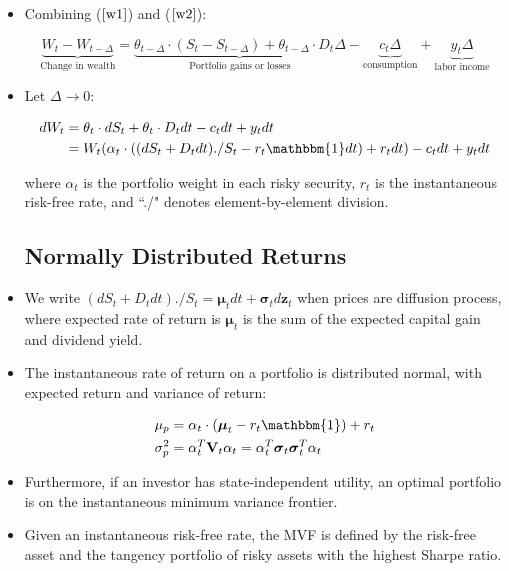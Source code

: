 \documentclass{article}
\newcommand{\Vbf}{\mathbf{V}}
\newcommand{\zbf}{\mathbf{z}}
\newcommand{\mubf}{\boldsymbol{\mu}}
\newcommand{\sigmabf}{\boldsymbol{\sigma}}
\newcommand{\onebf}{\mathbbm{1}}
\begin{document}
\begin{itemize}
\item Combining ($\ref{w1}$) and ($\ref{w2}$):

$$
\underbrace{W_t - W_{t-\Delta}}_{\text{Change in wealth}} = \underbrace{\theta_{t-\Delta} \cdot (S_t - S_{t-\Delta}) + \theta_{t-\Delta} \cdot D_t \Delta}_{\text{Portfolio gains or losses}} - \underbrace{c_t \Delta}_{\text{consumption}} + \underbrace{y_t \Delta}_{\text{labor income}}
$$

\item Let $\Delta \to 0$:

\begin{align*}
dW_t 
&= \theta_t \cdot dS_t + \theta_t \cdot D_t dt - c_t dt + y_t dt\\
&= W_t(\alpha_t \cdot ((dS_t + D_t dt)./S_t - r_t \onebf dt) + r_t dt) - c_t dt + y_t dt\\
\end{align*}

where $\alpha_t$ is the portfolio weight in each risky security, $r_t$ is the instantaneous risk-free rate, and ``./" denotes element-by-element division.

\subsection*{Normally Distributed Returns}

\item We write $(dS_t + D_t dt)./S_t = \mubf_t dt + \sigmabf_t d\zbf_t$ when prices are diffusion process, where expected rate of return is $\mubf_t$ is the sum of the expected capital gain and dividend yield.  

\item The instantaneous rate of return on a portfolio is distributed normal, with expected return and variance of return:

\begin{align*}
\mu_p &= \alpha_t \cdot (\mubf_t - r_t \onebf) + r_t\\
\sigma_p^2 &= \alpha_t^T \Vbf_t \alpha_t = \alpha_t^T \sigmabf_t \sigmabf_t^T \alpha_t
\end{align*}

\item Furthermore, if an investor has state-independent utility, an optimal portfolio is on the instantaneous minimum variance frontier. 

\item Given an instantaneous risk-free rate, the MVF is defined by the risk-free asset and the tangency portfolio of risky assets with the highest Sharpe ratio. 


\end{itemize}
\end{document}
